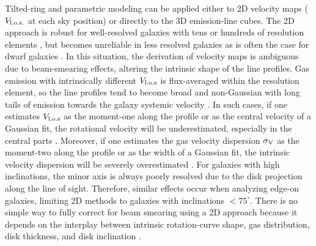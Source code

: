 \documentclass[a4paper,11pt]{article}
\begin{document}
Tilted-ring and parametric modeling can be applied either to 2D velocity maps ($V_{\rm l.o.s.}$ at each sky position) or directly to the 3D emission-line cubes. The 2D approach is robust for well-resolved galaxies with tens or hundreds of resolution elements \citep{Begeman1987, Begeman1989}, but becomes unreliable in less resolved galaxies as is often the case for dwarf galaxies \citep{Swaters2009}. In this situation, the derivation of velocity maps is ambiguous due to beam-smearing effects, altering the intrinsic shape of the line profiles. Gas emission with intrinsically different $V_{\rm l.o.s}$ is flux-averaged within the resolution element, so the line profiles tend to become broad and non-Gaussian with long tails of emission towards the galaxy systemic velocity \citep[e.g.,][]{deBlok2008}. In such cases, if one estimates $V_{\rm l.o.s}$ as the moment-one along the profile or as the central velocity of a Gaussian fit, the rotational velocity will be underestimated, especially in the central parts \citep[e.g.,][]{Swaters2009, Lelli2010}. Moreover, if one estimates the gas velocity dispersion $\sigma_{\rm V}$ as the moment-two along the profile or as the width of a Gaussian fit, the intrinsic velocity dispersion will be severely overestimated \citep{DiTeodoro2015}. For galaxies with high inclinations, the minor axis is always poorly resolved due to the disk projection along the line of sight. Therefore, similar effects occur when analyzing edge-on galaxies, limiting 2D methods to galaxies with inclinations $< 75^{\circ}$. There is no simple way to fully correct for beam smearing using a 2D approach because it depends on the interplay between intrinsic rotation-curve shape, gas distribution, disk thickness, and disk inclination \citep{Begeman1989}.
\end{document}

